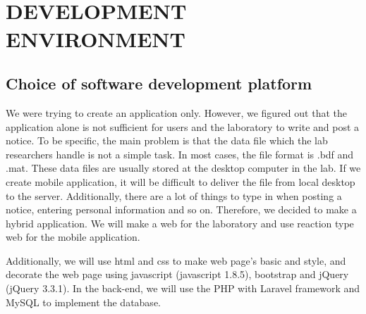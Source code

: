 \documentclass[letterpaper, 10 pt, conference]{ieeeconf}  %
\begin{document}
\section{\\DEVELOPMENT ENVIRONMENT}
\subsection{Choice of software development platform}


We were trying to create an application only. However, we figured out that the application alone is not sufficient for users and the laboratory to write and post a notice. To be specific, the main problem is that the data file which the lab researchers handle is not a simple task. In most cases, the file format is .bdf and .mat. These data files are usually stored at the desktop computer in the lab. If we create mobile application, it will be difficult to deliver the file from local desktop to the server. Additionally, there are a lot of things to type in when posting a notice, entering personal information and so on. Therefore, we decided to make a hybrid application. We will make a web for the laboratory and use reaction type web for the mobile application. 

Additionally, we will use html and css to make web page’s basic and style, and decorate the web page using javascript (javascript 1.8.5), bootstrap and jQuery (jQuery 3.3.1). In the back-end, we will use the PHP with Laravel framework and MySQL to implement the database. 
\end{document}
